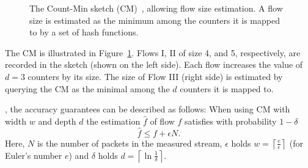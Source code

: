 \begin{figure}[!t]
\caption{\label{sktc-fig:CM} The Count-Min sketch (CM)~\cite{CountMin}, allowing flow size estimation.  A flow size is estimated as the minimum among the counters it is mapped to by a set of hash functions.}	
\end{figure}

The CM  is illustrated in Figure~\ref{sktc-fig:CM}. Flows I, II  of size 4, and 5, respectively, are recorded in the sketch (shown on the left side). Each flow increases the value of $d=3$ counters by its size.  The size of Flow III (right side) is estimated by querying the CM  as the minimal among the $d$ counters it is mapped to.

, the accuracy guarantees can be described as follows:
When using CM with width $w$ and depth $d$ the estimation $\hat{f}$ of flow $f$ satisfies with probability $1-\delta$
\[\hat{f} \leq f + \epsilon N.\]
Here, $N$ is the number of packets in the measured stream, $\epsilon$ holds $w = \left\lceil \frac{e}{\epsilon} \right\rceil$ (for Euler's number $e$) and $\delta$ holds $d= \left\lceil \ln\frac{1}{\delta} \right\rceil$.


